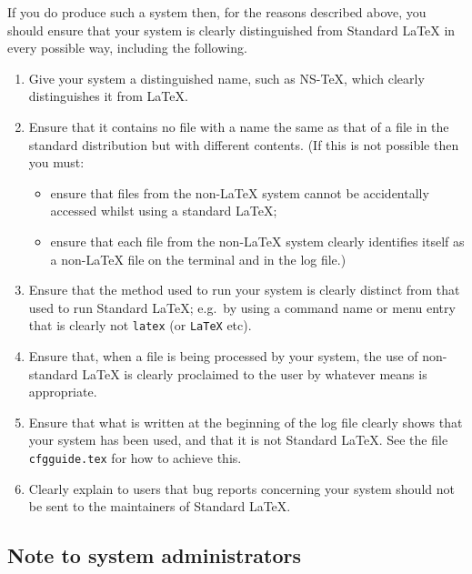 \documentclass{ltxguide}[1995/11/28]
\newcommand{\nstex}{\textsf{NS-TeX}}
\begin{document}
If you do produce such a system then, for the reasons described
above, you should ensure that your system is clearly distinguished
from Standard \LaTeX{} in every possible way, including the following.


\begin{enumerate}
\item
  Give your system a distinguished name, such as \nstex, which clearly
  distinguishes it from \LaTeX{}.

\item
  Ensure that it contains no file with a name the same as that of
  a file in the standard distribution but with different contents.
  (If this is not possible then you must:
  \begin{itemize}
  \item
    ensure that files from the non-\LaTeX{} system cannot be
    accidentally accessed whilst using a standard \LaTeX{};
  \item ensure that each file from the non-\LaTeX{} system clearly
    identifies itself as a non-\LaTeX{} file on the terminal and in the
    log file.)
  \end{itemize}

\item
  Ensure that the method used to run your system is clearly
\label{mcon:command}
  distinct from that used to run Standard \LaTeX; e.g.~by using a
  command name or menu entry that is clearly not \texttt{latex}
  (or \texttt{LaTeX} etc).

\item
  Ensure that, when a file is being processed by your system, the
  use of non-standard \LaTeX{} is clearly proclaimed to the user by
  whatever means is appropriate.

\item Ensure that what is written at the beginning of the log file
  clearly shows that your system has been used, and that it is
  not Standard \LaTeX{}.
  See the file \texttt{cfgguide.tex} for how to achieve this.

\item
 Clearly explain to users that bug reports concerning your
 system should not be sent to the maintainers of Standard
 \LaTeX{}.
\end{enumerate}

\subsection*{Note to system administrators}
\end{document}
